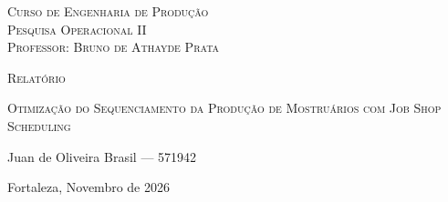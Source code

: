 \thispagestyle{empty}
\begin{titlingpage}



\begin{center}\large
    \textsc{Curso de Engenharia de Produção}\\
    \textsc{Pesquisa Operacional II }\\
    \textsc{Professor: Bruno de Athayde Prata}
    
    \vspace{4.5cm}
    
    {\LARGE \textsc{Relatório}}
    
    \vspace{1cm}
    
    {\LARGE \textsc{Otimização do Sequenciamento da Produção de Mostruários com Job Shop Scheduling}}

    \vspace{4cm}

    Juan de Oliveira Brasil --- 571942\\

    
    \vfill

    \normalsize{Fortaleza, Novembro de 2026}

\end{center}

\end{titlingpage}

